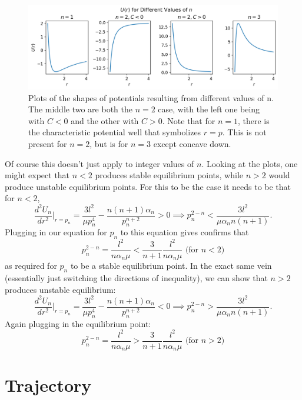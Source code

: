 \documentclass[letterpaper, reqno,11pt]{article}
\begin{document}
\begin{figure}[htpb]
    \centering
    \includegraphics[width=1\textwidth]{U-plots}
    \caption{Plots of the shapes of potentials resulting from different values of n. The middle two are both the $n=2$ case, with the left one being with $C<0$ and the other with $C>0$. Note that for $n=1$, there is the characteristic potential well that symbolizes $r=p$. This is not present for $n=2$, but is for $n=3$ except concave down. }
    \label{fig:U-plots}
\end{figure}

Of course this doesn't just apply to integer values of  $n$. Looking at the plots, one might expect that $n<2$ produces stable equilibrium points, while $n>2$ would produce unstable equilibrium points. For this to be the case it needs to be that for $n<2$,  
\[
\frac{d^2U_n}{dr^2}\bigg|_{r=p_n}=\frac{3l^2}{\mu p_n^{4}}-\frac{n(n+1)\alpha_n}{p_n^{n+2}}>0\implies p_n^{2-n}<\frac{3l^2}{\mu\alpha_n n (n+1)}
.\]
Plugging in our equation for $p_n$ to this equation gives confirms that 
\[
p_n^{2-n}=\frac{l^2}{n\alpha_n\mu}< \frac{3}{n+1} \frac{l^2}{n\alpha_n\mu}  \text{ (for $n<2$)}
\]
as required for $p_n$ to be a stable equilibrium point. In the exact same vein (essentially just switching the directions of inequality), we can show that $n>2$ produces unstable equilibrium: 
\[
\frac{d^2U_n}{dr^2}\bigg|_{r=p_n}=\frac{3l^2}{\mu p_n^{4}}-\frac{n(n+1)\alpha_n}{p_n^{n+2}}<0\implies p_n^{2-n}>\frac{3l^2}{\mu\alpha_n n (n+1)}
.\]
Again plugging in the equilibrium point: 
\[
p_n^{2-n}=\frac{l^2}{n\alpha_n\mu}> \frac{3}{n+1} \frac{l^2}{n\alpha_n\mu}  \text{ (for $n>2$)}
\]

\section{Trajectory}
\end{document}
